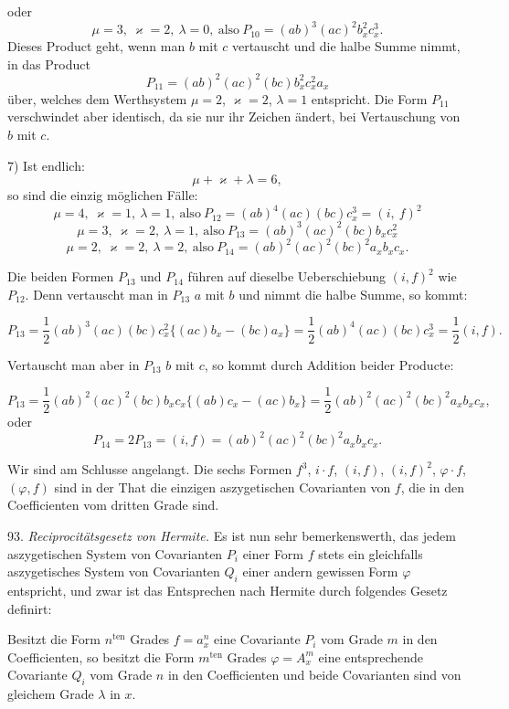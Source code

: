 oder
\[
\mu = 3,\ \varkappa = 2,\ \lambda = 0,\ \text{also}\ P_{10} = (ab)^3 (ac)^2 b_x^2 c_x^3.
\]
Dieses Product geht, wenn man $b$ mit $c$ vertauscht und die halbe Summe nimmt, in das Product
\[
P_{11} = (ab)^2 (ac)^2 (bc) b_x^2 c_x^2 a_x
\]
über, welches dem Werthsystem $\mu = 2$, $\varkappa = 2$, $\lambda = 1$ entspricht. Die Form $P_{11}$ verschwindet aber identisch, da sie nur ihr Zeichen ändert, bei Vertauschung von $b$ mit $c$.

7) Ist endlich:
\[
\mu + \varkappa + \lambda = 6,
\]
so sind die einzig möglichen Fälle:
\[
\mu = 4,\ \varkappa = 1,\ \lambda = 1,\ \text{also}\ P_{12} = (ab)^4 (ac) (bc) c_x^3 = (i,\ f)^2
\]
\[
\mu = 3,\ \varkappa = 2,\ \lambda = 1,\ \text{also}\ P_{13} = (ab)^3 (ac)^2 (bc) b_x c_x^2
\]
\[
\mu = 2,\ \varkappa = 2,\ \lambda = 2,\ \text{also}\ P_{14} = (ab)^2 (ac)^2 (bc)^2 a_x b_x c_x.
\]


Die beiden Formen $P_{13}$ und $P_{14}$ führen auf dieselbe Ueberschiebung $(i,f)^2$ wie $P_{12}$. Denn vertauscht man in $P_{13}$ $a$ mit $b$ und nimmt die halbe Summe, so kommt:

\[
P_{13}=\frac{1}{2}(ab)^3(ac)(bc)c_x^2\{(ac)b_x-(bc)a_x\}=\frac{1}{2}(ab)^4(ac)(bc)c_x^3=\frac{1}{2}(i,f).
\]

Vertauscht man aber in $P_{13}$ $b$ mit $c$, so kommt durch Addition beider Producte:

\[
P_{13}=\frac{1}{2}(ab)^2(ac)^2(bc)b_xc_x\{(ab)c_x-(ac)b_x\}=\frac{1}{2}(ab)^2(ac)^2(bc)^2a_xb_xc_x,
\]
oder
\[
P_{14}=2P_{13}=(i,f)=(ab)^2(ac)^2(bc)^2a_xb_xc_x.
\]

Wir sind am Schlusse angelangt. Die sechs Formen $f^3$, $i\cdot f$, $(i,f)$, $(i,f)^2$, $\varphi\cdot f$, $(\varphi,f)$ sind in der That die einzigen aszygetischen Covarianten von $f$, die in den Coefficienten vom dritten Grade sind.

93. \textit{Reciprocitätsgesetz von Hermite.} Es ist nun sehr bemerkenswerth, das jedem aszygetischen System von Covarianten $P_i$ einer Form $f$ stets ein gleichfalls aszygetisches System von Covarianten $Q_i$ einer andern gewissen Form $\varphi$ entspricht, und zwar ist das Entsprechen nach Hermite durch folgendes Gesetz definirt:

\glqq Besitzt die Form $n^{\mathrm{ten}}$ Grades $f=a_x^n$ eine Covariante $P_i$ vom Grade $m$ in den Coefficienten, so besitzt die Form $m^{\mathrm{ten}}$ Grades $\varphi=A_x^m$ eine entsprechende Covariante $Q_i$ vom Grade $n$ in den Coefficienten und beide Covarianten sind von gleichem Grade $\lambda$ in $x$.\grqq{}

